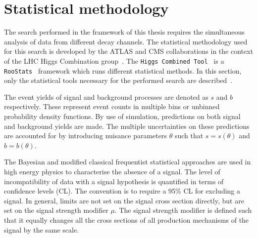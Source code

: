 \section{Statistical methodology}
\label{sec:Stat}
The search performed in the framework of this thesis requires the simultaneous analysis of data from different decay channels. The statistical methodology used for this search is developed by the ATLAS and CMS collaborations in the context of the LHC Higgs Combination group~\cite{Chatrchyan:2012tx,Cowan:2010js,CMS-PAS-HIG-12-020,CMS-NOTE-2011-005}. The \texttt{Higgs Combined Tool}~\cite{HiggsCombine} is a 
\texttt{RooStats}~\cite{Moneta:2010pm} framework which runs different statistical methods. In this section, only the statistical tools necessary for the performed search are described~\cite{Cowan:2010js}.

The event yields of signal and background processes are denoted as $s$ and $b$ respectively. These represent event counts in multiple bins or unbinned probability density functions. By use of simulation, predictions on both signal and background yields are made. The multiple uncertainties on these predictions are accounted for by introducing nuisance parameters $\theta$ such that $s = s(\theta)$ and $b=b(\theta)$.%

The Bayesian and modified classical frequentist statistical approaches are used in high energy physics to characterise the absence of a signal.  The level of incompatibility of data with a signal hypothesis is quantified in terms of confidence levels (CL). The convention is to require a 95\% CL for excluding a signal. In general, limits are not set on the signal cross section directly, but are set on the signal strength modifier $\mu$. The signal strength modifier is defined such that it equally changes all the cross sections of all production mechanisms of the signal by the same scale.  




